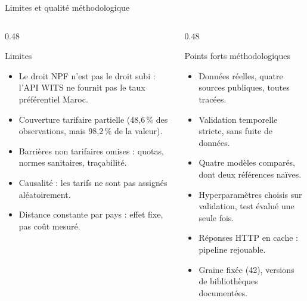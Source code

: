 \documentclass[aspectratio=169,10pt]{beamer}
\begin{document}
\begin{frame}{Limites et qualité méthodologique}
  \begin{columns}[T,onlytextwidth]
    \begin{column}{0.48\textwidth}
      \begin{block}{Limites}
        \begin{itemize}
          \item Le droit NPF n'est pas le droit subi : l'API WITS ne
                fournit pas le taux préférentiel Maroc.
          \item Couverture tarifaire partielle (48,6\,\% des
                observations, mais 98,2\,\% de la valeur).
          \item Barrières non tarifaires omises : quotas, normes
                sanitaires, traçabilité.
          \item Causalité : les tarifs ne sont pas assignés aléatoirement.
          \item Distance constante par pays : effet fixe, pas coût mesuré.
        \end{itemize}
      \end{block}
    \end{column}
    \begin{column}{0.48\textwidth}
      \begin{block}{Points forts méthodologiques}
        \begin{itemize}
          \item Données réelles, quatre sources publiques, toutes tracées.
          \item Validation temporelle stricte, sans fuite de données.
          \item Quatre modèles comparés, dont deux références naïves.
          \item Hyperparamètres choisis sur validation, test évalué une
                seule fois.
          \item Réponses HTTP en cache : pipeline rejouable.
          \item Graine fixée (42), versions de bibliothèques documentées.
        \end{itemize}
      \end{block}
    \end{column}
  \end{columns}
\end{frame}
\end{document}
